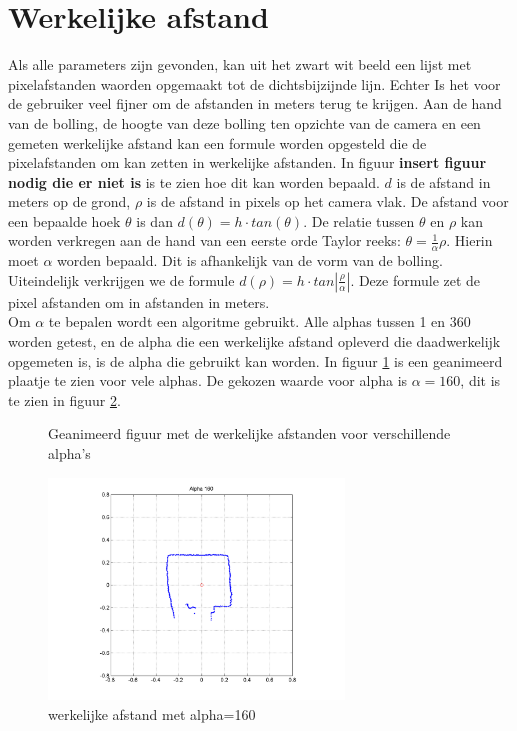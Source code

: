 \documentclass[a4paper]{article}
\begin{document}
\section{Werkelijke afstand}
Als alle parameters zijn gevonden, kan uit het zwart wit beeld een lijst met pixelafstanden waorden opgemaakt tot de dichtsbijzijnde lijn. Echter Is het voor de gebruiker veel fijner om de afstanden in meters terug te krijgen. Aan de hand van de bolling, de hoogte van deze bolling ten opzichte van de camera en een gemeten werkelijke afstand kan een formule worden opgesteld die de pixelafstanden om kan zetten in werkelijke afstanden. In figuur \textbf{insert figuur nodig die er niet is} is te zien hoe dit kan worden bepaald. $d$ is de afstand in meters op de grond, $\rho$ is de afstand in pixels op het camera vlak. De afstand voor een bepaalde hoek $\theta$ is dan $d(\theta)=h \cdot tan(\theta)$. De relatie tussen $\theta$ en $\rho$ kan worden  verkregen aan de hand van een eerste orde Taylor reeks: $\theta = \frac{1}{\alpha}\rho$. Hierin moet $\alpha$ worden bepaald. Dit is afhankelijk van de vorm van de bolling. Uiteindelijk verkrijgen we de formule $d(\rho)=h\cdot tan|\frac{\rho}{\alpha}|$. Deze formule zet de pixel afstanden om in afstanden in meters.\\
Om $\alpha$ te bepalen wordt een algoritme gebruikt. Alle alphas tussen 1 en 360 worden getest, en de alpha die een werkelijke afstand opleverd die daadwerkelijk opgemeten is, is de alpha die gebruikt kan worden. In figuur \ref{fig:anim_alpha} is een geanimeerd plaatje te zien voor vele alphas. De gekozen waarde voor alpha is $\alpha = 160$, dit is te zien in figuur \ref{fig:alpha160}.

\begin{figure}[htbp]
	\caption{Geanimeerd figuur met de werkelijke afstanden voor verschillende alpha's}
 	\label{fig:anim_alpha}
\end{figure}

\begin{figure}[h]
	\centering
	\includegraphics[width=0.7\textwidth]{img/alpha/alpha_160.png}
	\caption{werkelijke afstand met alpha=160}
	\label{fig:alpha160}
\end{figure}
\end{document}
